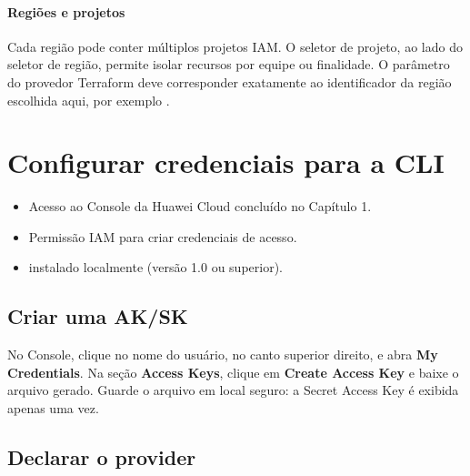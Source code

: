 \documentclass{guide}
\begin{document}
\paragraph{Regiões e projetos}
Cada região pode conter múltiplos projetos IAM. O seletor de projeto, ao lado
do seletor de região, permite isolar recursos por equipe ou finalidade. O
parâmetro  do provedor Terraform deve corresponder exatamente ao
identificador da região escolhida aqui, por exemplo .

\section{Configurar credenciais para a CLI}

\begin{objetivos}

  \prerequisitos
  \begin{itemize}
    \item Acesso ao Console da Huawei Cloud concluído no Capítulo 1.
    \item Permissão IAM para criar credenciais de acesso.
    \item {} instalado localmente (versão 1.0 ou superior).
  \end{itemize}
\end{objetivos}

\subsection{Criar uma AK/SK}


No Console, clique no nome do usuário, no canto superior direito, e abra
\textbf{My Credentials}. Na seção \textbf{Access Keys}, clique em
\textbf{Create Access Key} e baixe o arquivo gerado. Guarde o arquivo em local
seguro: a Secret Access Key é exibida apenas uma vez.

\subsection{Declarar o provider}
\end{document}
